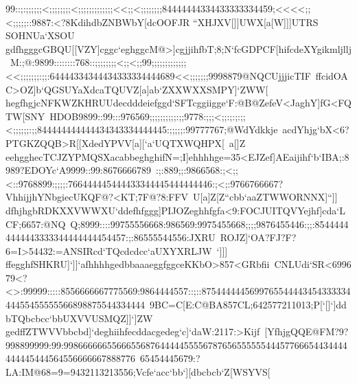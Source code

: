 {{{ 99::;:;;;;;;<;;;;;;;;<;;;;;;;;;;;;;<<;;<;;;;;;;;84444444334433333334459;<<<<;;<;;;;;::9887:<?8KdihdbZNBWbY[dcOOFJR%
 ``XHJXV[]]UWX[a[W]]]UTRS%
 SOHNUa`XSOU}
 \hbox{gdfhgggcGBQU[[VZY]cggc`eghggcM@>]cgjjihfbT;8;N`fcGDPCF[hifcdeXYgikmljllj%
 M:;@:9899::::::::768::;;;;;;;;<;;<;;99;;;;;;;;;;;;;<<;;;;;;;:;;:64444334344434333334444689<<;;;;;;;9998879@NQCUjjjicTIF%
 ffcidOAC>OZ]b`QGSUYaXdcaTQUVZ[a]ab`ZXXWXXSMPY]`ZWW[%
 }
 \hbox{hegfhgjcNFKWZKHRUUdecdddeiefggd`SFTcggiigge`F:@B@ZefeV<JaghY]fG<FQTW[SNY%
 HDOB9899::99:::976569;;;;;;;;;;:;;9778:;;;<;;:;:;:;;<;;;;;;:;;844444444444434343334444445:;;;;;:99777767;@WdYdkkje%
 acdYhjg`bX<6?PTGKZQQB>R[[XdedYPVV[a][`a`UQTXWQHPX[%
 a[]Z}
 \hbox{eehgghecTCJZYPMQSXacabbeghghifN=;I]ehhhhge=35<EJZef]AEaijihf`b`IBA;:8989?EDOYc`A9999::99:8676666789%
 :;:889;;:9866568:;<;;<::9768899:;;;;:766444445444433344445444444446:;<;:9766766667?VhhijjhYNbgiecUKQF@?<KT;7F@?8:FFV%
 U[a]Z[Z``cbb`aaZTWWORNNX]``]]}
 \hbox{dfhjhgbRDKXXVWWXU`ddefhfggg]PIJOZeghhfgfa<9:FOCJUITQVYejhf]cda`LCF;6657:@NQ%
 Q;8999::::99755556668:986569:9975455668;;;;9876455446:;;:85444444444443333344444444454457:;:86555544556:JXRU%
 ROJZ]`OA?FJ?F?6=I>54432:=ANSIRcd`TQcdcdcc`aUXYXRLJW%
 `]]]}
 \hbox{ffegghfSHKRU]`]]`afhhhhgedbbaaaeggfggceKKbO>857<GRbfii%
 CNLUdi`SR<699679<?<>:99999:::::8556666667775569:9864444557::;::875444444569976554444345433333444455455555566898875544334444%
 9BC=C[E:C@BA857CL;642577211013;P[`[]`]ddbTQbcbcc`bbUXVVUSMQZ]]`]ZW}
 \hbox{gedffZTWVVbbcbd]`deghiihfecddacgedeg`c]`daW:2117:>Kijf%
 [YfhjgQQE@FM?9?998899999:99:99866666655666556876444445555678765655555544457766654434444444445444564556666667888776%
 65454445679:?LA:IM@68=9=9432113213556;Vcfe`acc`bb`][dbcbcb`Z[WSYVS[%
}}}
